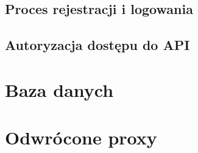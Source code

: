 	\subsection{Proces rejestracji i logowania}

	\subsection{Autoryzacja dostępu do API}

\section{Baza danych}

\section{Odwrócone proxy}